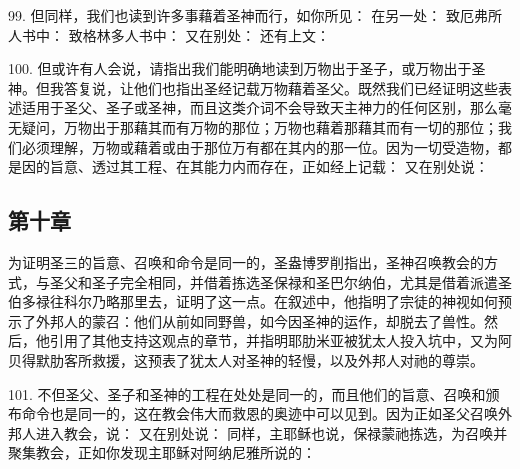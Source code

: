 99. 但同样，我们也读到许多事藉着圣神而行，如你所见：  在另一处：  致厄弗所人书中：  致格林多人书中：  又在别处：  还有上文： \par

100. 但或许有人会说，请指出我们能明确地读到万物出于圣子，或万物出于圣神。但我答复说，让他们也指出圣经记载万物藉着圣父。既然我们已经证明这些表述适用于圣父、圣子或圣神，而且这类介词不会导致天主神力的任何区别，那么毫无疑问，万物出于那藉其而有万物的那位；万物也藉着那藉其而有一切的那位；我们必须理解，万物或藉着或由于那位万有都在其内的那一位。因为一切受造物，都是因的旨意、透过其工程、在其能力内而存在，正如经上记载：  又在别处说：\par


\subsection{第十章}

为证明圣三的旨意、召唤和命令是同一的，圣盎博罗削指出，圣神召唤教会的方式，与圣父和圣子完全相同，并借着拣选圣保禄和圣巴尔纳伯，尤其是借着派遣圣伯多禄往科尔乃略那里去，证明了这一点。在叙述中，他指明了宗徒的神视如何预示了外邦人的蒙召：他们从前如同野兽，如今因圣神的运作，却脱去了兽性。然后，他引用了其他支持这观点的章节，并指明耶肋米亚被犹太人投入坑中，又为阿贝得默肋客所救援，这预表了犹太人对圣神的轻慢，以及外邦人对祂的尊崇。\par

101. 不但圣父、圣子和圣神的工程在处处是同一的，而且他们的旨意、召唤和颁布命令也是同一的，这在教会伟大而救恩的奥迹中可以见到。因为正如圣父召唤外邦人进入教会，说：  又在别处说：  同样，主耶稣也说，保禄蒙祂拣选，为召唤并聚集教会，正如你发现主耶稣对阿纳尼雅所说的： \par

